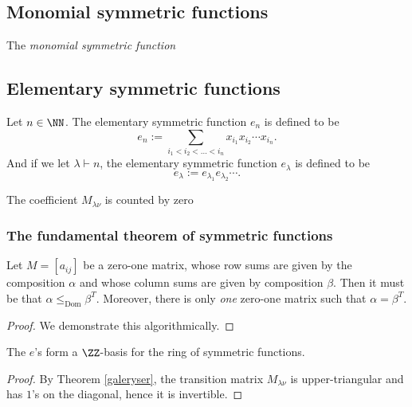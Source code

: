 \documentclass{article}
\DeclareMathOperator{\Dom}{Dom}
\begin{document}
\subsection{Monomial symmetric functions}

\begin{definition}
    The \textit{monomial symmetric function}
\end{definition}
\subsection{Elementary symmetric functions}

\begin{definition}
    Let $n\in\NN$. The elementary symmetric function $e_n$ is defined to be
    \[
        e_n := \sum_{i_1<i_2<\ldots<i_n} x_{i_1}x_{i_2}\cdots x_{i_n}.
    \]
    And if we let $\lambda \vdash n$, the elementary symmetric function $e_\lambda$ is defined to be
    \[
        e_\lambda := e_{\lambda_1}e_{\lambda_2}\cdots.
    \]
\end{definition}

\begin{theorem}
    The coefficient $M_{\lambda\nu}$ is counted by zero
\end{theorem}

\subsubsection{The fundamental theorem of symmetric functions}
\begin{theorem} \label{galeryser} Let $M = [a_{ij}]$ be a zero-one matrix, whose row sums are given by the composition $\alpha$ and whose column sums are given by composition $\beta$. Then it must be that $\alpha \leq_{\Dom} \beta^T$. Moreover, there is only \textit{one} zero-one matrix such that $\alpha = \beta^T$.
\end{theorem}

\begin{proof}
    We demonstrate this algorithmically.
\end{proof}
\begin{theorem} The $e$'s form a $\ZZ$-basis for the ring of symmetric functions.
\end{theorem}

\begin{proof}
    By Theorem \ref{galeryser}, the transition matrix $M_{\lambda\nu}$ is upper-triangular and has $1$'s on the diagonal, hence it is invertible. 
\end{proof}
\end{document}
